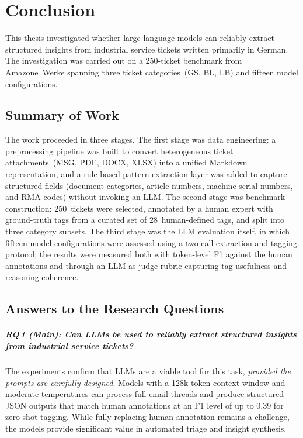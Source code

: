 \chapter{Conclusion}
%
\label{chap:Conclusion}
%
This thesis investigated whether large language models can reliably extract
structured insights from industrial service tickets written primarily in
German.  The investigation was carried out on a 250-ticket benchmark
from Amazone~Werke spanning three ticket categories~(GS, BL, LB) and
fifteen model configurations.

\section{Summary of Work}
\label{sec:summary}
%
The work proceeded in three stages.  The first stage was data engineering: a
preprocessing pipeline was built to convert heterogeneous ticket
attachments~(MSG, PDF, DOCX, XLSX) into a unified Markdown representation, and a
rule-based pattern-extraction layer was added to capture structured
fields (document categories, article numbers, machine serial numbers, and RMA
codes) without invoking an LLM.  The second stage was benchmark construction:
250~tickets were selected, annotated by a human expert with ground-truth tags
from a curated set of 28~human-defined tags, and split into three category
subsets.  The third
stage was the LLM evaluation itself, in which fifteen model configurations were
assessed using a two-call extraction and tagging protocol; the results were
measured both with token-level F1 against the human annotations and through an
LLM-as-judge rubric capturing tag usefulness and reasoning coherence.

\section{Answers to the Research Questions}
\label{sec:rq-answers}
%
\paragraph{RQ\,1 (Main): Can LLMs be used to reliably extract structured insights
from industrial service tickets?}
The experiments confirm that LLMs are a viable tool for this task,
\emph{provided the prompts are carefully designed}.  Models with a
128k-token context window and moderate temperatures can
process full email threads and produce structured JSON outputs that match
human annotations at an F1 level of up to 0.39 for zero-shot tagging.
While fully replacing human annotation remains a challenge, the models
provide significant value in automated triage and insight synthesis.

